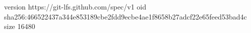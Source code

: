 version https://git-lfs.github.com/spec/v1
oid sha256:466522437a344e853189cbe2fdd9ecbe4ae1f8658b27adcf22e65feed53bad4c
size 16480
